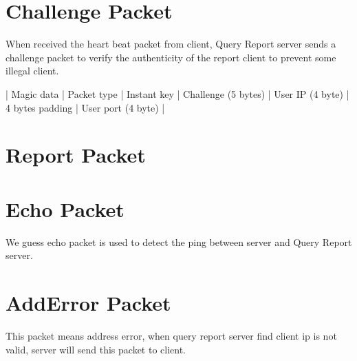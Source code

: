 \documentclass[oneside,titlepage,a4paper]{Definition/retrospy} %
\begin{document}
\section{Challenge Packet}
When received the heart beat packet from client, Query Report server sends a challenge packet to verify the authenticity of the report client to prevent some illegal client.
\ServerResponse 
\begin{mybox}
	| Magic data | Packet type | Instant key | Challenge (5 bytes) | User IP (4 byte) | 4 bytes padding | User port (4 byte) |
\end{mybox} 
\section{Report Packet}



\section{Echo Packet}
We guess echo packet is used to detect the ping between server and Query Report server.



\section{AddError Packet}
This packet means address error, when query report server find client ip is not valid, server will send this packet to client.



%

%
%
%

%

%
%
%
%
\end{document}
